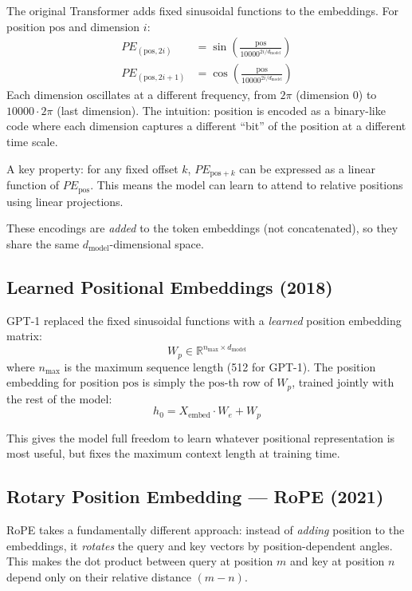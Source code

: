 \documentclass[11pt,a4paper]{article}
\newcommand{\R}{\mathbb{R}}
\newcommand{\dmodel}{d_{\text{model}}}
\begin{document}
The original Transformer \cite{vaswani2017} adds fixed sinusoidal functions to the
embeddings. For position $\text{pos}$ and dimension $i$:
\begin{align}
  PE_{(\text{pos}, 2i)}   &= \sin\!\left(\frac{\text{pos}}{10000^{2i/\dmodel}}\right) \\[4pt]
  PE_{(\text{pos}, 2i+1)} &= \cos\!\left(\frac{\text{pos}}{10000^{2i/\dmodel}}\right)
\end{align}
Each dimension oscillates at a different frequency, from $2\pi$ (dimension 0) to
$10000 \cdot 2\pi$ (last dimension). The intuition: position is encoded as a binary-like
code where each dimension captures a different ``bit'' of the position at a different
time scale.

A key property: for any fixed offset $k$, $PE_{\text{pos}+k}$ can be expressed as a
linear function of $PE_{\text{pos}}$. This means the model can learn to attend to
relative positions using linear projections.

These encodings are \emph{added} to the token embeddings (not concatenated), so they share
the same $\dmodel$-dimensional space.

\subsection{Learned Positional Embeddings (2018)}

GPT-1 \cite{radford2018} replaced the fixed sinusoidal functions with a \emph{learned}
position embedding matrix:
\begin{equation}
  W_p \in \R^{n_{\max} \times \dmodel}
\end{equation}
where $n_{\max}$ is the maximum sequence length (512 for GPT-1). The position embedding
for position $\text{pos}$ is simply the $\text{pos}$-th row of $W_p$, trained jointly with
the rest of the model:
\begin{equation}
  h_0 = X_{\text{embed}} \cdot W_e + W_p
\end{equation}

This gives the model full freedom to learn whatever positional representation is most
useful, but fixes the maximum context length at training time.

\subsection{Rotary Position Embedding --- RoPE (2021)}
\label{sec:rope}

RoPE \cite{su2021} takes a fundamentally different approach: instead of \emph{adding}
position to the embeddings, it \emph{rotates} the query and key vectors by
position-dependent angles. This makes the dot product between query at position $m$ and
key at position $n$ depend only on their relative distance $(m - n)$.
\end{document}
